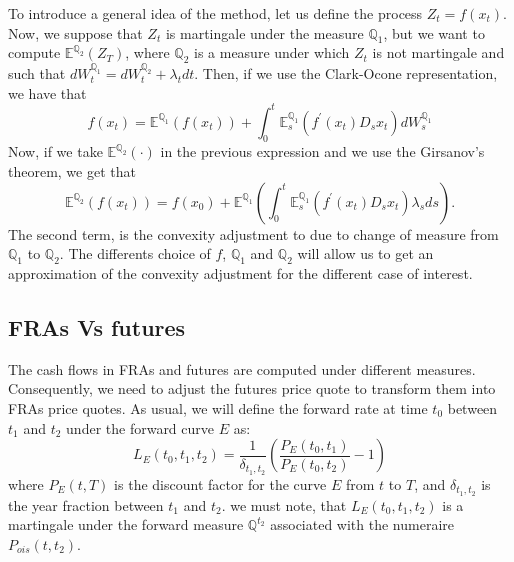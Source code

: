 \documentclass[a4paper,10pt]{article}
\newcommand{\1}{\mathbf{1}}
\begin{document}
To introduce a general idea of the method, let us define the process $Z_t = f(x_t)$. Now, we suppose that $Z_t$ is martingale under the measure $\mathbb{Q}_1$, but we want to compute $\mathbb{E}^{\mathbb{Q}_2}\left(Z_T \right)$, where $\mathbb{Q}_2$ is a measure under which $Z_t$ is not martingale and such that $dW^{\mathbb{Q}_1}_t = dW^{\mathbb{Q}_2}_t +\lambda_t dt$. Then, if we use the Clark-Ocone representation, we have that
\begin{equation*}
f(x_t) = \mathbb{E}^{\mathbb{Q}_1}\left(f(x_t)\right) + \int_{0}^{t} \mathbb{E}^{\mathbb{Q}_1}_s\left( f^{\prime}(x_t) D_s x_t  \right) dW^{\mathbb{Q}_1}_s
\end{equation*}
Now, if we take $\mathbb{E}^{\mathbb{Q}_2}\left( \cdot \right)$ in the previous expression and we use the Girsanov's theorem, we get that
\begin{equation}\label{general_convexity}
\mathbb{E}^{\mathbb{Q}_2}\left( f(x_t) \right) = f(x_0) + \mathbb{E}^{\mathbb{Q}_1} \left(\int_{0}^{t}  \mathbb{E}^{\mathbb{Q}_1}_s\left( f^{\prime}(x_t) D_s x_t  \right) \lambda_s ds \right). 
\end{equation}
The second term, is the convexity adjustment to due to change of measure from $\mathbb{Q}_1$ to $\mathbb{Q}_2$. The differents choice of $f$, $\mathbb{Q}_1$ and $\mathbb{Q}_2$ will allow us to get an approximation of the convexity adjustment for the different case of interest. 
\subsection{FRAs Vs futures}
 The cash flows in FRAs and futures are computed under different measures. Consequently, we need to adjust the futures price quote to transform them into FRAs price quotes. As usual, we will define the forward rate at time $t_0$ between $t_1$ and $t_2$ under the forward curve $E$ as:
\begin{equation}\label{forward_rate}
L_{E}(t_0, t_1, t_2) = \frac{1}{\delta_{t_1,t_2}}\left(\frac{P_{E}(t_0,t_1)}{P_{E}(t_0,t_2)} - 1 \right)
\end{equation} 
where $P_{E}(t,T)$ is the discount factor for the curve $E$ from $t$ to $T$, and $\delta_{t_1,t_2}$ is the year fraction between $t_1$ and $t_2$. we must note, that $L_{E}(t_0, t_1, t_2)$ is a martingale under the forward measure $\mathbb{Q}^{t_2}$ associated with the numeraire $P_{ois}(t,t_2)$.
\end{document}
